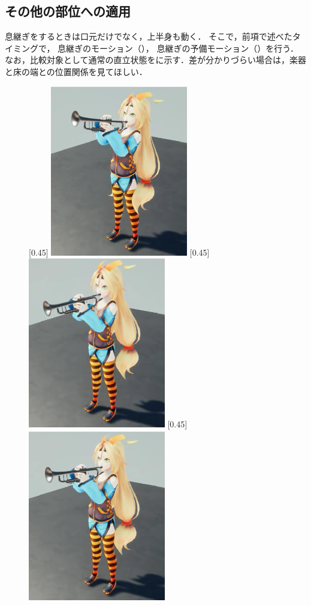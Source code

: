\subsection{その他の部位への適用}
\indent
息継ぎをするときは口元だけでなく，上半身も動く．
そこで，前項で述べたタイミングで，
息継ぎのモーション（），
息継ぎの予備モーション（）を行う．
なお，比較対象として通常の直立状態をに示す．差が分かりづらい場合は，楽器と床の端との位置関係を見てほしい．\\
\begin{figure}[!h]
	\centering
	[0.45\linewidth]{
		\includegraphics[width=6cm]{fig/chap3/up.eps}}
	[0.45\linewidth]{
		\includegraphics[width=6cm]{fig/chap3/down.eps}}
	[0.45\linewidth]{
		\includegraphics[width=6cm]{fig/chap3/default.eps}}

\end{figure}
